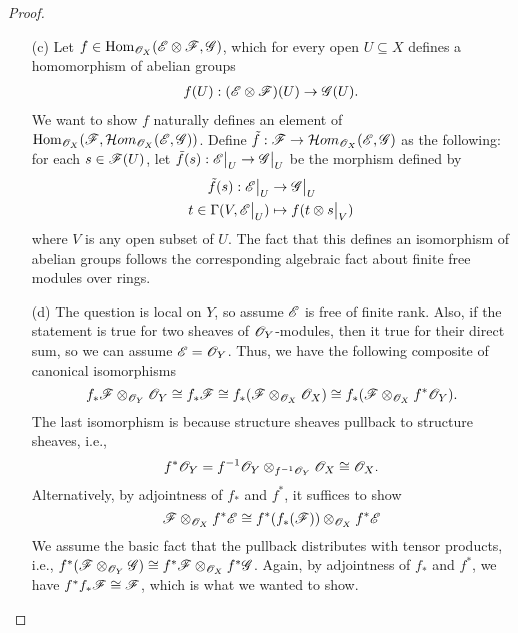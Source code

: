 \documentclass{article}
\begin{document}
\begin{enumerate} [label=\textbf{\arabic*.}, leftmargin=0em]
\begin{proof}
\begin{itemize} [leftmargin=0em]
    \item[(c)] Let $f \in \operatorname{Hom}_{\mathscr{O}_X}(\mathscr{E} \otimes \mathscr{F}, \mathscr{G})$, which for every open $U \subseteq X$ defines a homomorphism of abelian groups
    \begin{align*}
        f(U) : (\mathscr{E} \otimes \mathscr{F})(U) \to \mathscr{G}(U).
    \end{align*}
    We want to show $f$ naturally defines an element of $\operatorname{Hom}_{\mathscr{O}_X}(\mathscr{F}, \mathcal{H}om_{\mathscr{O}_X}(\mathscr{E}, \mathscr{G}))$. Define $\tilde{f} : \mathscr{F} \to \mathcal{H}om_{\mathscr{O}_X}(\mathscr{E}, \mathscr{G})$ as the following: for each $s \in \mathscr{F}(U)$, let $\tilde{f}(s) : \restr{\fE}{U} \to \restr{\fG}{U}$ be the morphism defined by
    \begin{align*}
        \tilde{f}(s) : \restr{\fE}{U} & \to \restr{\fG}{U} \\
        t \in \Gamma(V, \restr{\fE}{U}) & \mapsto f(t \otimes \restr{s}{V})
    \end{align*}
    where $V$ is any open subset of $U$. The fact that this defines an isomorphism of abelian groups follows the corresponding algebraic fact about finite free modules over rings.

    \item[(d)] The question is local on $Y$, so assume $\mathscr{E}$ is free of finite rank. Also, if the statement is true for two sheaves of $\mathscr{O}_Y$-modules, then it true for their direct sum, so we can assume $\mathscr{E} = \mathscr{O}_Y$. Thus, we have the following composite of canonical isomorphisms
    \begin{equation*}
        f_* \mathscr{F} \otimes_{\mathscr{O}_Y} \mathscr{O}_Y \cong f_* \mathscr{F} \cong f_*(\mathscr{F} \otimes_{\mathscr{O}_X} \mathscr{O}_X) \cong f_*(\mathscr{F} \otimes_{\mathscr{O}_X} f^*\mathscr{O}_Y).
    \end{equation*}
    The last isomorphism is because structure sheaves pullback to structure sheaves, i.e.,
    \begin{equation*}
        f^*\mathscr{O}_Y = f^{-1}\mathscr{O}_Y \otimes_{f^{-1}\mathscr{O}_Y} \mathscr{O}_X \cong \mathscr{O}_X.
    \end{equation*}
    Alternatively, by adjointness of $f_*$ and $f^*$, it suffices to show
    \begin{equation*}
        \mathscr{F} \otimes_{\mathscr{O}_X} f^* \mathscr{E} \cong f^*(f_*(\mathscr{F})) \otimes_{\mathscr{O}_X} f^*\mathscr{E}
    \end{equation*}
    We assume the basic fact that the pullback distributes with tensor products, i.e., $f^*(\mathscr{F} \otimes_{\mathscr{O}_Y} \mathscr{G}) \cong f^* \mathscr{F} \otimes_{\mathscr{O}_X} f^* \mathscr{G}$. Again, by adjointness of $f_*$ and $f^*$, we have $f^* f_* \mathscr{F} \cong \mathscr{F}$, which is what we wanted to show.
\end{itemize}
\end{proof}


\end{enumerate}
\end{document}
